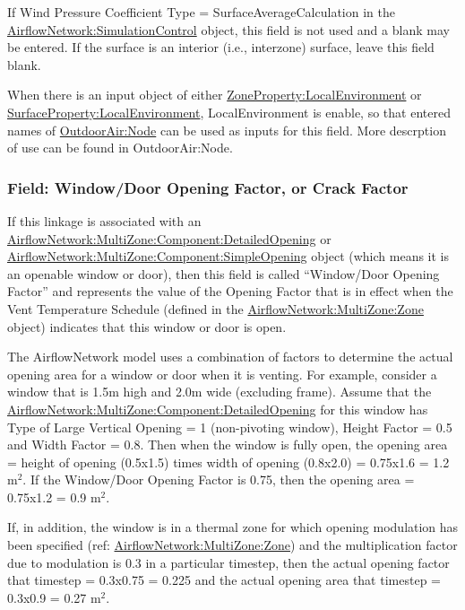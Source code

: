 If Wind Pressure Coefficient Type = SurfaceAverageCalculation in the \hyperref[airflownetworksimulationcontrol]{AirflowNetwork:\hyperref[simulationcontrol]{SimulationControl}}
object, this field is not used and a blank may be entered. If the surface is an
interior (i.e., interzone) surface, leave this field blank.

When there is an input object of either \hyperref[ZonePropertylocalEnvironment]{ZoneProperty:LocalEnvironment} or \hyperref[surfacePropertylocalEnvironment]{SurfaceProperty:LocalEnvironment}, LocalEnvironment is enable, so that entered names of \hyperref[outdoorairnode]{OutdoorAir:Node} can be used as inputs for this field. More descrption of use can be found in  OutdoorAir:Node.

\subsubsection{Field: Window/Door Opening Factor, or Crack Factor}\label{field-windowdoor-opening-factor-or-crack-factor}

If this linkage is associated with an \hyperref[airflownetworkmultizonecomponentdetailedopening]{AirflowNetwork:MultiZone:Component:DetailedOpening} or \hyperref[airflownetworkmultizonecomponentsimpleopening]{AirflowNetwork:MultiZone:Component:SimpleOpening} object (which means it is an openable window or door), then this field is called ``Window/Door Opening Factor'' and represents the value of the Opening Factor that is in effect when the Vent Temperature Schedule (defined in the \hyperref[airflownetworkmultizonezone]{AirflowNetwork:MultiZone:Zone} object) indicates that this window or door is open.

The AirflowNetwork model uses a combination of factors to determine the actual opening area for a window or door when it is venting. For example, consider a window that is 1.5m high and 2.0m wide (excluding frame). Assume that the \hyperref[airflownetworkmultizonecomponentdetailedopening]{AirflowNetwork:MultiZone:Component:DetailedOpening} for this window has Type of Large Vertical Opening = 1 (non-pivoting window), Height Factor = 0.5 and Width Factor = 0.8. Then when the window is fully open, the opening area = height of opening (0.5x1.5) times width of opening (0.8x2.0) = 0.75x1.6 = 1.2 m\(^{2}\). If the Window/Door Opening Factor is 0.75, then the opening area = 0.75x1.2 = 0.9 m\(^{2}\).

If, in addition, the window is in a thermal zone for which opening modulation has been specified (ref: \hyperref[airflownetworkmultizonezone]{AirflowNetwork:MultiZone:Zone}) and the multiplication factor due to modulation is 0.3 in a particular timestep, then the actual opening factor that timestep = 0.3x0.75 = 0.225 and the actual opening area that timestep = 0.3x0.9 = 0.27 m\(^{2}\).

